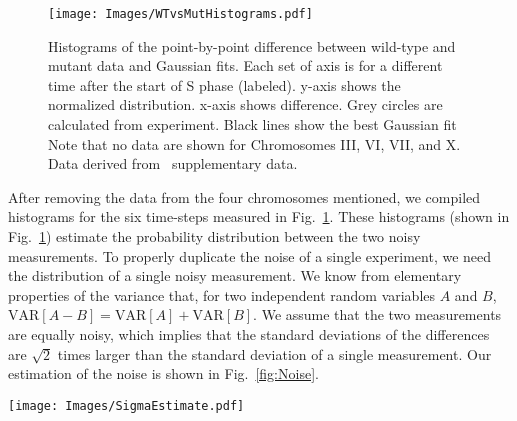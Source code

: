 		\begin{figure}[tbh]
			\begin{center}
				\texttt{[image: Images/WTvsMutHistograms.pdf]}
			\end{center}
				\caption[Estimating Experimental Noise B]{\label{fig:HistDifference} Histograms of the point-by-point difference between wild-type and mutant data and Gaussian fits.
					Each set of axis is for a different time after the start of S phase (labeled).
					y-axis shows the normalized distribution.
					x-axis shows difference.
					Grey circles are calculated from experiment.
					Black lines show the best Gaussian fit
					Note that no data are shown for Chromosomes III, VI, VII, and X.
					Data derived from~\cite{StochasticTermination} supplementary data.
				}
		\end{figure}
		
		After removing the data from the four chromosomes mentioned, we compiled histograms for the six time-steps measured in Fig.~\ref{fig:HistDifference}.
		These histograms (shown in Fig.~\ref{fig:HistDifference}) estimate the probability distribution between the two noisy measurements.
		To properly duplicate the noise of a single experiment, we need the distribution of a single noisy measurement.
		We know from elementary properties of the variance that, for two independent random variables $A$ and $B$, $\text{VAR}[A-B] = \text{VAR}[A] + \text{VAR}[B]$.
		We assume that the two measurements are equally noisy, which implies that the standard deviations of the differences are $\sqrt{2}$ times larger than the standard deviation of a single measurement.
		Our estimation of the noise is shown in Fig.~\ref{fig:Noise}.
		
		\begin{SCfigure}[1][tbh]
			\texttt{[image: Images/SigmaEstimate.pdf]}
			\caption[Estimated Simulation and Experimental Noise]{\label{fig:Noise} 
				Scatter plot of estimated $\sigma$ vs time since the start of S phase for experimental data and simulation data.
				Black circles show experimental estimates.
				Open circles show simulation estimates.
				Crosses show calculated values for $\sigma_\text{add}$ (Eq.~\ref{eq:AddingNoise})
				dots show estimates from simulations with added Gaussian noise.
			}
		\end{SCfigure}
		
